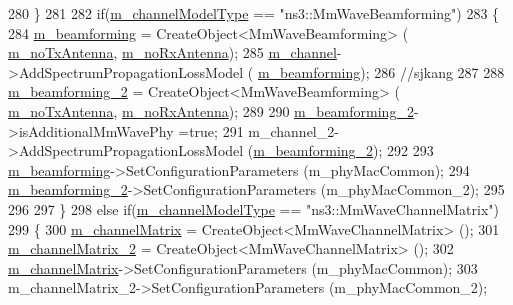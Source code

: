 \begin{DoxyCode}
280         \}
281 
282         \textcolor{keywordflow}{if}(\hyperlink{classns3_1_1MmWaveHelper_aec88d691230f0db9448a7f953301bb24}{m\_channelModelType} == \textcolor{stringliteral}{"ns3::MmWaveBeamforming"})
283         \{
284                 \hyperlink{classns3_1_1MmWaveHelper_a4fa071b6d755f32a684906150660b381}{m\_beamforming} = CreateObject<MmWaveBeamforming> (
      \hyperlink{classns3_1_1MmWaveHelper_ad88599b0380c87427187dd5ed61f0d4b}{m\_noTxAntenna}, \hyperlink{classns3_1_1MmWaveHelper_a2830b26fda8f11334d1d0291a3c110f7}{m\_noRxAntenna});
285                 \hyperlink{classns3_1_1MmWaveHelper_adac6d83bc2acef8b7dbd9fc668207d95}{m\_channel}->AddSpectrumPropagationLossModel (
      \hyperlink{classns3_1_1MmWaveHelper_a4fa071b6d755f32a684906150660b381}{m\_beamforming});
286         \textcolor{comment}{//sjkang}
287 
288                 \hyperlink{classns3_1_1MmWaveHelper_a3406a28781481686589a5275787bf43f}{m\_beamforming\_2} = CreateObject<MmWaveBeamforming> (
      \hyperlink{classns3_1_1MmWaveHelper_ad88599b0380c87427187dd5ed61f0d4b}{m\_noTxAntenna}, \hyperlink{classns3_1_1MmWaveHelper_a2830b26fda8f11334d1d0291a3c110f7}{m\_noRxAntenna});
289 
290                 \hyperlink{classns3_1_1MmWaveHelper_a3406a28781481686589a5275787bf43f}{m\_beamforming\_2}->isAdditionalMmWavePhy =\textcolor{keyword}{true};
291                 m\_channel\_2->AddSpectrumPropagationLossModel (\hyperlink{classns3_1_1MmWaveHelper_a3406a28781481686589a5275787bf43f}{m\_beamforming\_2});
292 
293                 \hyperlink{classns3_1_1MmWaveHelper_a4fa071b6d755f32a684906150660b381}{m\_beamforming}->SetConfigurationParameters (m\_phyMacCommon);
294                 \hyperlink{classns3_1_1MmWaveHelper_a3406a28781481686589a5275787bf43f}{m\_beamforming\_2}->SetConfigurationParameters (m\_phyMacCommon\_2);
295 
296 
297         \}
298         \textcolor{keywordflow}{else} \textcolor{keywordflow}{if}(\hyperlink{classns3_1_1MmWaveHelper_aec88d691230f0db9448a7f953301bb24}{m\_channelModelType} == \textcolor{stringliteral}{"ns3::MmWaveChannelMatrix"})
299         \{
300                 \hyperlink{classns3_1_1MmWaveHelper_a731a9e28a12edacd78b96800025db070}{m\_channelMatrix} = CreateObject<MmWaveChannelMatrix> ();
301                 \hyperlink{classns3_1_1MmWaveHelper_af2907a9f5719984dfef74e3736e35bc5}{m\_channelMatrix\_2} = CreateObject<MmWaveChannelMatrix> ();
302                 \hyperlink{classns3_1_1MmWaveHelper_a731a9e28a12edacd78b96800025db070}{m\_channelMatrix}->SetConfigurationParameters (m\_phyMacCommon);
303                 m\_channelMatrix\_2->SetConfigurationParameters (m\_phyMacCommon\_2);

\end{DoxyCode}
